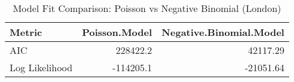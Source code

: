 \begin{table}

\caption{\label{tab:tab:model_comparison_london}Model Fit Comparison: Poisson vs Negative Binomial (London)}
\centering
\begin{tabular}[t]{lrr}
\toprule
Metric & Poisson.Model & Negative.Binomial.Model\\
\midrule
AIC & 228422.2 & 42117.29\\
Log Likelihood & -114205.1 & -21051.64\\
\bottomrule
\end{tabular}
\end{table}
